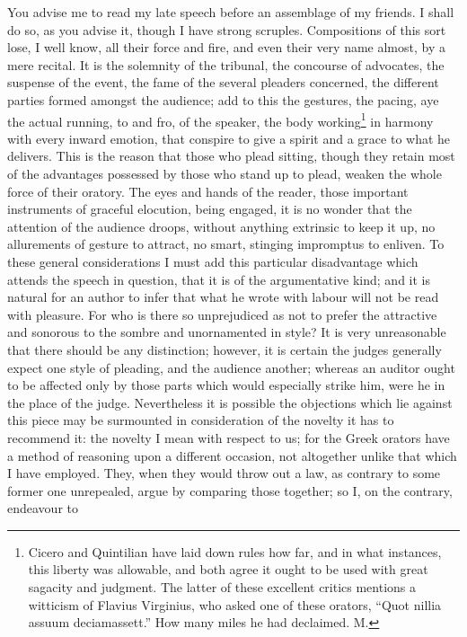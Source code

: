 You advise me to read my late speech before an assemblage of my friends. I
shall do so, as you advise it, though I have strong scruples. Compositions
of this sort lose, I well know, all their force and fire, and even their
very name almost, by a mere recital. It is the solemnity of the tribunal,
the concourse of advocates, the suspense of the event, the fame of the
several pleaders concerned, the different parties formed amongst the
audience; add to this the gestures, the pacing, aye the actual running, to
and fro, of the speaker, the body working\footnote{Cicero and Quintilian
have laid down rules how far, and in what instances, this liberty was
allowable, and both agree it ought to be used with great sagacity and
judgment. The latter of these excellent critics mentions a witticism of
Flavius Virginius, who asked one of these orators, ``Quot nillia assuum
deciamassett.'' How many miles he had declaimed. M.} in harmony with every
inward emotion, that conspire to give a spirit and a grace to what he
delivers. This is the reason that those who plead sitting, though they
retain most of the advantages possessed by those who stand up to plead,
weaken the whole force of their oratory. The eyes and hands of the reader,
those important instruments of graceful elocution, being engaged, it is no
wonder that the attention of the audience droops, without anything
extrinsic to keep it up, no allurements of gesture to attract, no smart,
stinging impromptus to enliven. To these general considerations I must add
this particular disadvantage which attends the speech in question, that it
is of the argumentative kind; and it is natural for an author to infer
that what he wrote with labour will not be read with pleasure. For who is
there so unprejudiced as not to prefer the attractive and sonorous to the
sombre and unornamented in style? It is very unreasonable that there
should be any distinction; however, it is certain the judges generally
expect one style of pleading, and the audience another; whereas an auditor
ought to be affected only by those parts which would especially strike
him, were he in the place of the judge. Nevertheless it is possible the
objections which lie against this piece may be surmounted in consideration
of the novelty it has to recommend it: the novelty I mean with respect to
us; for the Greek orators have a method of reasoning upon a different
occasion, not altogether unlike that which I have employed. They, when
they would throw out a law, as contrary to some former one unrepealed,
argue by comparing those together; so I, on the contrary, endeavour to
